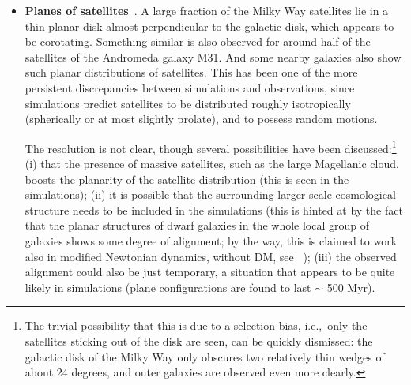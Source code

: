 \begin{itemize}
A more likely resolution therefore lies elsewhere. One option is that the total mass of the Milky Way halo is overestimated --- if the mass of Milky Way is in the lower part of the currently allowed observational range (see eq.~(\ref{eq:M200:value})) this would imply that the most massive satellites are also expected to be lighter, in line with observations. The other possibility is simply statistics - there is large halo-to-halo scatter for the mass of the most massive subhalos, and Milky Way could just happen to be one of the downward fluctuations. The too big to fail problem is also less of an issue when comparing with $N$-body simulations that include baryons, in particular because in that case the galaxies can form DM cores instead of cuspy profiles (see section \ref{sec:cuspcore}), and thus lead to smaller halo masses. In summary, there appears to be consensus among current cosmological simulations that there is no `too big to fail' problem for Milky Way and M31 satellites anymore, while it may still be present for isolated dwarf galaxies in the nearby Universe.


\item[$\blacktriangleright$]
{\bf Planes of satellites}~\cite{satellite_plane}. A large fraction of the Milky Way satellites lie in a thin planar disk almost perpendicular to the galactic disk, which appears to be corotating. Something similar is also observed for around half of the satellites of the Andromeda galaxy M31. And some nearby galaxies also show such planar distributions of satellites. This has been one of the more persistent discrepancies between simulations and observations, since simulations predict satellites to be distributed roughly isotropically (spherically or at most slightly prolate), and to possess random motions.

The resolution is not clear, though several possibilities have been discussed:\footnote{The trivial possibility that this is due to a selection bias, i.e.,~only the satellites sticking out of the disk are seen, can be quickly dismissed: the galactic disk of the Milky Way only obscures two relatively thin wedges of about 24 degrees, and outer galaxies are observed even more clearly.} (i) that the presence of massive satellites, such as the large Magellanic cloud, boosts the planarity of the satellite distribution (this is seen in the simulations); (ii) it is possible that the surrounding larger scale cosmological structure needs to be included in the simulations (this is hinted at by the fact that the planar structures of dwarf galaxies in the whole local group of galaxies shows some degree of alignment; by the way, this is claimed to work also in modified Newtonian dynamics, without DM, see ~\cite{satellite_plane}); (iii) the observed alignment could also be just temporary, a situation that appears to be quite likely in simulations (plane configurations are found to last $\sim$ 500 Myr).


\end{itemize}
